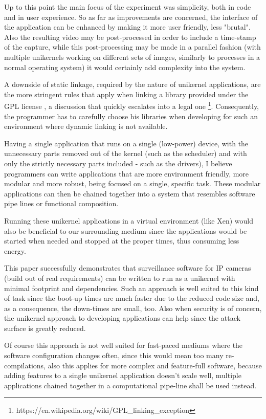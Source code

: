 \documentclass[10pt,a4paper,twoside]{article}
\begin{document}
Up to this point the main focus of the experiment was simplicity, both in code and in user experience.
So as far as improvements are concerned, the interface of the application can be enhanced by making
it more user friendly, less "brutal". Also the resulting video may be post-processed in order to
include a time-stamp of the capture,
while this post-processing may be made in a parallel fashion (with multiple unikernels working
on different sets of images, similarly to processes in a normal operating system) it would certainly add complexity
into the system.

A downside of static linkage, required by the nature of unikernel applications, are the more
stringent rules that apply when linking a library provided under the GPL license \cite{gpl},
a discussion that quickly escalates into a legal one
\footnote{https://en.wikipedia.org/wiki/GPL\_linking\_exception}. Consequently,
the programmer has to carefully choose his libraries when developing for such an environment where
dynamic linking is not available.

Having a single application that runs on a single (low-power) device, with the unnecessary parts removed out
of the kernel (such as the scheduler) and with only the strictly necessary parts included - such as the drivers),
I believe programmers can write applications that are more environment friendly,
more modular and more robust, being focused on a single, specific task. These modular applications can
then be chained together into a system that resembles software pipe lines or functional composition.

Running these unikernel applications in a virtual environment (like Xen) would also be
beneficial to our surrounding medium since the applications would be started when
needed and stopped at the proper times, thus consuming less energy. \cite{DataCenterEnergyForeCast} \cite{JinWenChen}

This paper successfully demonstrates that surveillance software for IP cameras
(build out of real requirements) can be written to run as a unikernel with minimal footprint and dependencies.
 Such an approach is well suited to this kind of task since the boot-up times
 are much faster due to the reduced code size and, as a consequence, the down-times are small, too.
 Also when security is of concern, the unikernel approach to developing applications can help since
 the attack surface is greatly reduced.

 Of course this approach is not well suited for fast-paced mediums where the software configuration changes often,
 since this would mean too many re-compilations, also this applies for more complex and feature-full software,
 because adding features to a single unikernel application doesn't scale well,
 multiple applications chained together in a computational pipe-line shall be used instead.
\end{document}
